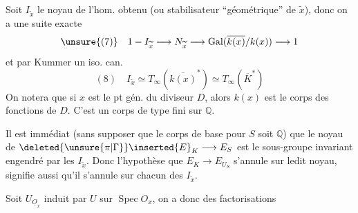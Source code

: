 Soit $I_{\widetilde x}$ le noyau de l'hom. obtenu (ou stabilisateur ``géométrique'' de $\widetilde x$), donc on a une suite exacte
\[
\unsure{(7)}\quad 1-I_{\widetilde x}\longrightarrow N_{\widetilde x}\longrightarrow\operatorname{Gal}(\overline{k(x)}/k(x))\longrightarrow1
\]
et par Kummer un iso. can.
\[
(8)\quad I_{\widetilde x}\simeq T_\infty(\overline{k(x)}^*)\simeq T_\infty(\overline K^*)
\]
On notera que si $x$ est le pt gén. du diviseur $D$, alors $k(x)$ est le corps des fonctions de $D$. C'est un corps de type fini sur $\mathbb Q$.

Il est immédiat (sans supposer que le corps de base pour $S$ soit $\mathbb Q$) que le noyau de $\deleted{\unsure{\pi|\Gamma}}\inserted{E}_K\longrightarrow E_S$ est le sous-groupe invariant engendré par les $I_{\widetilde x}$. Donc l'hypothèse que $E_K\longrightarrow E_{U_S}$ s'annule sur ledit noyau, signifie aussi qu'il s'annule sur chacun des $I_{\widetilde x}$.

Soit  $U_{\underline O_x}$ induit par $U$ sur $\operatorname{Spec}O_x$, on a donc des factorisations
